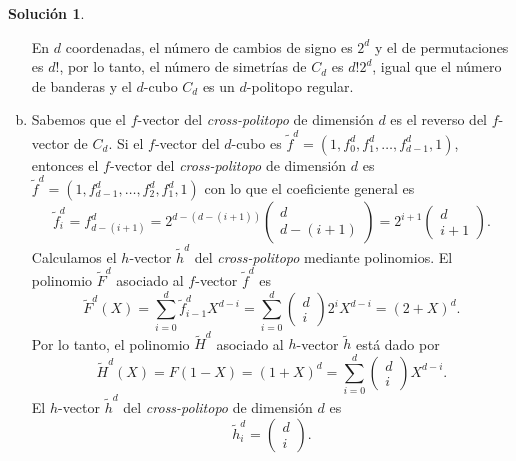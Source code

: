 \documentclass[10pt]{article}
\theoremstyle{definition}
\newtheorem*{sol}{Solución}
\begin{document}
\begin{sol}
\begin{enumerate}[(a)]
En $d$ coordenadas, el número de cambios de signo es $2^d$ y el de permutaciones es $d!$, por lo tanto, el número de simetrías de $C_d$ es $d!2^d$, igual que el número de banderas y el $d$-cubo $C_d$ es un $d$-politopo regular.
\item Sabemos que el $f$-vector del \textit{cross-politopo} de dimensión $d$ es el reverso del $f$-vector de $C_d$. Si el $f$-vector del $d$-cubo es $\tilde{f}^d=\left(1,f_0^d,f_1^d,\ldots, f_{d-1}^d,1\right)$, entonces el $f$-vector del \textit{cross-politopo} de dimensión $d$ es $\tilde{f}^d=\left(1,f_{d-1}^d,\ldots,f_2^d,f_1^d,1\right)$ con lo que el coeficiente general es
\[\tilde{f}_i^d=f_{d-(i+1)}^d=2^{d-(d-(i+1))}\begin{pmatrix}d\\ d-(i+1)\end{pmatrix}=2^{i+1}\begin{pmatrix}d\\ i+1\end{pmatrix}.\]
Calculamos el $h$-vector $\tilde{h}^d$ del \textit{cross-politopo} mediante polinomios. El polinomio $\tilde{F}^d$ asociado al $f$-vector $\tilde{f}^d$ es
\[\tilde{F}^d(X)=\sum_{i=0}^d\tilde{f}_{i-1}^dX^{d-i}=\sum_{i=0}^d\begin{pmatrix}d\\ i\end{pmatrix}2^iX^{d-i}=(2+X)^d.\]
Por lo tanto, el polinomio $\tilde{H}^d$ asociado al $h$-vector $\tilde{h}$ está dado por
\[\tilde{H}^d(X)=F(1-X)=(1+X)^d=\sum_{i=0}^d\begin{pmatrix}d\\ i\end{pmatrix}X^{d-i}.\]
El $h$-vector $\tilde{h}^d$ del \textit{cross-politopo} de dimensión $d$ es 
\[\tilde{h}^d_i=\begin{pmatrix}d\\ i\end{pmatrix}.
\]

\end{enumerate}
\end{sol}
\end{document}

